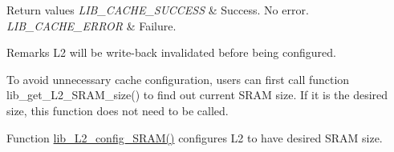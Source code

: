 \begin{DoxyRetVals}{Return values}
{\em L\+I\+B\+\_\+\+C\+A\+C\+H\+E\+\_\+\+S\+U\+C\+C\+E\+S\+S} & Success. No error. \\
\hline
{\em L\+I\+B\+\_\+\+C\+A\+C\+H\+E\+\_\+\+E\+R\+R\+O\+R} & Failure.\\
\hline
\end{DoxyRetVals}
\begin{DoxyRemark}{Remarks}
L2 will be write-\/back invalidated before being configured. 

To avoid unnecessary cache configuration, users can first call function lib\+\_\+get\+\_\+\+L2\+\_\+\+S\+R\+A\+M\+\_\+size() to find out current S\+R\+A\+M size. If it is the desired size, this function does not need to be called.
\end{DoxyRemark}
Function \hyperlink{group__libarch__cachecfg_ga529504ec5196118f6fc9d744b6209d61}{lib\+\_\+\+L2\+\_\+config\+\_\+\+S\+R\+A\+M()} configures L2 to have desired S\+R\+A\+M size. 
